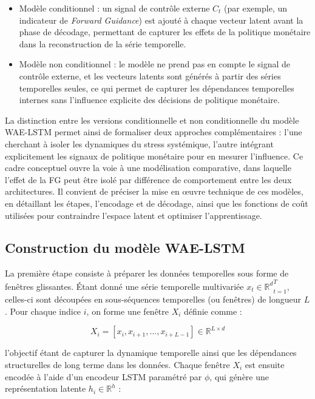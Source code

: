 \begin{itemize}
    \item Modèle conditionnel : un signal de contrôle externe $C_t$ (par exemple, un indicateur de \textit{Forward Guidance}) est ajouté à chaque vecteur latent avant la phase de décodage, permettant de capturer les effets de la politique monétaire dans la reconstruction de la série temporelle.
    \item Modèle non conditionnel : le modèle ne prend pas en compte le signal de contrôle externe, et les vecteurs latents sont générés à partir des séries temporelles seules, ce qui permet de capturer les dépendances temporelles internes sans l'influence explicite des décisions de politique monétaire.
\end{itemize}

La distinction entre les versions conditionnelle et non conditionnelle du modèle WAE-LSTM permet ainsi de formaliser deux approches complémentaires : l’une cherchant à isoler les dynamiques du stress systémique, l’autre intégrant explicitement les signaux de politique monétaire pour en mesurer l’influence. Ce cadre conceptuel ouvre la voie à une modélisation comparative, dans laquelle l’effet de la FG peut être isolé par différence de comportement entre les deux architectures. Il convient de préciser la mise en œuvre technique de ces modèles, en détaillant les étapes, l'encodage et de décodage, ainsi que les fonctions de coût utilisées pour contraindre l’espace latent et optimiser l’apprentissage.

\subsection{Construction du modèle WAE-LSTM}

La première étape consiste à préparer les données temporelles sous forme de fenêtres glissantes. Étant donné une série temporelle multivariée ${x_t \in \mathbb{R}^d}_{t=1}^T$, celles-ci sont découpées en sous-séquences temporelles (ou fenêtres) de longueur $L$. Pour chaque indice $i$, on forme une fenêtre $X_i$ définie comme :

\begin{equation}
X_i = \left[x_i, x_{i+1}, \dots, x_{i+L-1}\right] \in \mathbb{R}^{L \times d}
\end{equation}

l’objectif étant de capturer la dynamique temporelle ainsi que les dépendances structurelles de long terme dans les données. Chaque fenêtre $X_i$ est ensuite encodée à l’aide d’un encodeur LSTM paramétré par $\phi$, qui génère une représentation latente $h_i \in \mathbb{R}^h$ :

